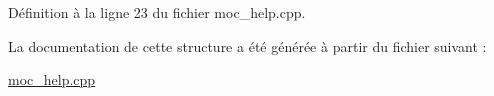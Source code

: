 Définition à la ligne 23 du fichier moc\-\_\-help.\-cpp.



La documentation de cette structure a été générée à partir du fichier suivant \-:\begin{DoxyCompactItemize}
\item 
\hyperlink{moc__help_8cpp}{moc\-\_\-help.\-cpp}\end{DoxyCompactItemize}

